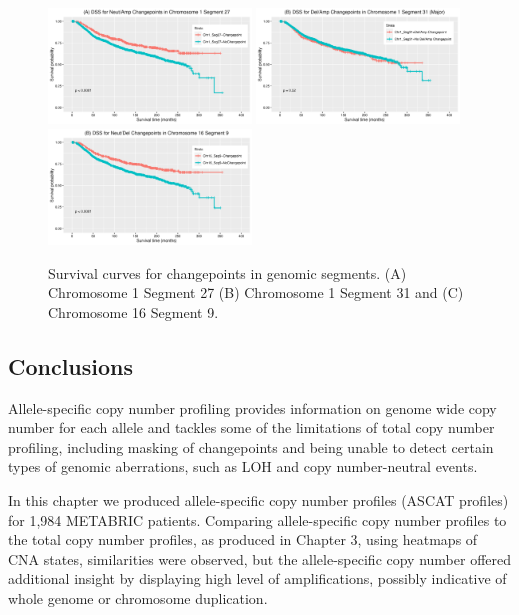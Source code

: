 \begin{figure}[!htb]
\centering
\includegraphics[width = 0.48\textwidth]{../figures/Chapter_6/survplot_Chr1Seg27.png}
\includegraphics[width = 0.48\textwidth]{../figures/Chapter_6/survplot_Chr1Seg31.png}
\includegraphics[width = 0.48\textwidth]{../figures/Chapter_6/survplot_Chr16Seg9.png}
\caption[Survival curves for changepoints in genomic segments.]{Survival curves for changepoints in genomic segments. (A) Chromosome 1 Segment 27 (B) Chromosome 1 Segment 31 and (C) Chromosome 16 Segment 9.}
\label{fig:TopLength_Segments_Surv}
\end{figure}

\subsection{Conclusions}
Allele-specific copy number profiling provides information on genome wide copy number for each allele and tackles some of the limitations of total copy number profiling, including masking of changepoints and being unable to detect certain types of genomic aberrations, such as LOH and copy number-neutral events.

In this chapter we produced allele-specific copy number profiles (ASCAT profiles) for 1,984 METABRIC patients. Comparing allele-specific copy number profiles to the total copy number profiles, as produced in Chapter 3, using heatmaps of CNA states, similarities were observed, but the allele-specific copy number offered additional insight by displaying high level of amplifications, possibly indicative of whole genome or chromosome duplication. 

